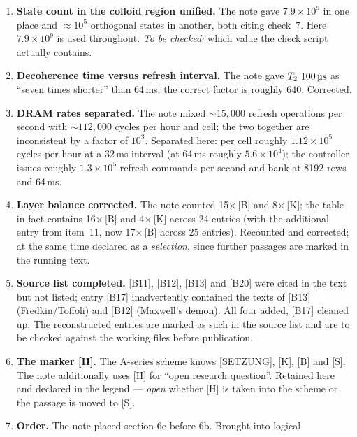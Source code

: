 \begin{enumerate}[leftmargin=1.6em,itemsep=0.4em]
  \item \textbf{State count in the colloid region unified.} The note gave
        $7.9\times10^{9}$ in one place and ${\approx}10^{5}$ orthogonal states in
        another, both citing check~7. Here $7.9\times10^{9}$ is used throughout.
        \emph{To be checked:} which value the check script actually contains.
  \item \textbf{Decoherence time versus refresh interval.} The note gave
        $T_2 \sim 100\,\text{\textmu s}$ as “seven times shorter” than 64\,ms; the
        correct factor is roughly 640. Corrected.
  \item \textbf{DRAM rates separated.} The note mixed ${\sim}15{,}000$ refresh
        operations per second with ${\sim}112{,}000$ cycles per hour and cell; the
        two together are inconsistent by a factor of $10^{3}$. Separated here: per
        cell roughly $1.12\times10^{5}$ cycles per hour at a 32\,ms interval (at
        64\,ms roughly $5.6\times10^{4}$); the controller issues roughly
        $1.3\times10^{5}$ refresh commands per second and bank at 8192 rows and
        64\,ms.
  \item \textbf{Layer balance corrected.} The note counted 15$\times$\,[B] and
        8$\times$\,[K]; the table in fact contains 16$\times$\,[B] and
        4$\times$\,[K] across 24 entries (with the additional entry from item~11,
        now 17$\times$\,[B] across 25 entries). Recounted and corrected; at the same
        time declared as a \emph{selection}, since further passages are marked in
        the running text.
  \item \textbf{Source list completed.} [B11], [B12], [B13] and [B20] were cited
        in the text but not listed; entry [B17] inadvertently contained the texts
        of [B13] (Fredkin/Toffoli) and [B12] (Maxwell's demon). All four added,
        [B17] cleaned up. The reconstructed entries are marked as such in the
        source list and are to be checked against the working files before
        publication.
  \item \textbf{The marker [H].} The A-series scheme knows [SETZUNG], [K], [B] and
        [S]. The note additionally uses [H] for “open research question”. Retained
        here and declared in the legend --- \emph{open} whether [H] is taken into
        the scheme or the passage is moved to [S].
  \item \textbf{Order.} The note placed section 6c before 6b. Brought into logical

\end{enumerate}
